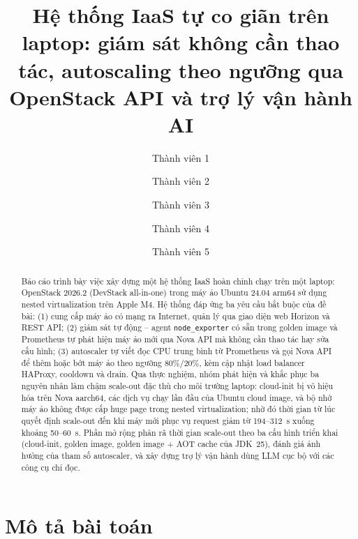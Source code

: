 \documentclass[runningheads]{llncs}
\newcommand{\code}[1]{\texttt{#1}}
\begin{document}
\title{Hệ thống IaaS tự co giãn trên laptop: giám sát không cần thao tác, autoscaling theo ngưỡng qua OpenStack API và trợ lý vận hành AI}

\author{Thành viên 1 \and Thành viên 2 \and Thành viên 3 \and Thành viên 4 \and Thành viên 5}

\maketitle

\begin{abstract}
Báo cáo trình bày việc xây dựng một hệ thống IaaS hoàn chỉnh chạy trên một laptop: OpenStack 2026.2 (DevStack all-in-one) trong máy ảo Ubuntu 24.04 arm64 sử dụng nested virtualization trên Apple M4. Hệ thống đáp ứng ba yêu cầu bắt buộc của đề bài: (1) cung cấp máy ảo có mạng ra Internet, quản lý qua giao diện web Horizon và REST API; (2) giám sát tự động – agent \code{node\_exporter} có sẵn trong golden image và Prometheus tự phát hiện máy ảo mới qua Nova API mà không cần thao tác hay sửa cấu hình; (3) autoscaler tự viết đọc CPU trung bình từ Prometheus và gọi Nova API để thêm hoặc bớt máy ảo theo ngưỡng 80\%/20\%, kèm cập nhật load balancer HAProxy, cooldown và drain. Qua thực nghiệm, nhóm phát hiện và khắc phục ba nguyên nhân làm chậm scale-out đặc thù cho môi trường laptop: cloud-init bị vô hiệu hóa trên Nova aarch64, các dịch vụ chạy lần đầu của Ubuntu cloud image, và bộ nhớ máy ảo không được cấp huge page trong nested virtualization; nhờ đó thời gian từ lúc quyết định scale-out đến khi máy mới phục vụ request giảm từ 194–312~s xuống khoảng 50–60~s. Phần mở rộng phân rã thời gian scale-out theo ba cấu hình triển khai (cloud-init, golden image, golden image + AOT cache của JDK~25), đánh giá ảnh hưởng của tham số autoscaler, và xây dựng trợ lý vận hành dùng LLM cục bộ với các công cụ chỉ đọc.
\end{abstract}

\section{Mô tả bài toán}
\end{document}
